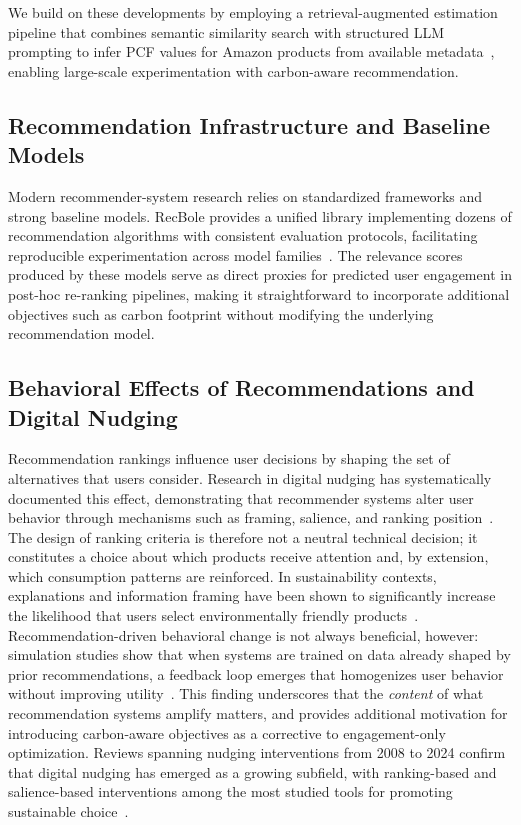 \documentclass[11pt]{article}
\begin{document}
We build on these developments by employing a retrieval-augmented estimation pipeline that
combines semantic similarity search with structured LLM prompting to infer PCF values for Amazon products from available
metadata~\cite{amazon2015, amazon2023}, enabling large-scale experimentation with
carbon-aware recommendation.

\subsection{Recommendation Infrastructure and Baseline Models}

Modern recommender-system research relies on standardized frameworks and strong baseline
models. RecBole provides a unified library implementing dozens of recommendation algorithms
with consistent evaluation protocols, facilitating reproducible experimentation across model
families~\cite{recbole2021}. The relevance scores produced by these models serve as direct
proxies for predicted user engagement in post-hoc re-ranking pipelines, making it
straightforward to incorporate additional objectives such as carbon footprint without
modifying the underlying recommendation model.

\subsection{Behavioral Effects of Recommendations and Digital Nudging}

Recommendation rankings influence user decisions by shaping the set of alternatives that
users consider. Research in digital nudging has systematically documented this effect,
demonstrating that recommender systems alter user behavior through mechanisms such as
framing, salience, and ranking position~\cite{jesse2021digitalnudging}. The design of
ranking criteria is therefore not a neutral technical decision; it constitutes a choice
about which products receive attention and, by extension, which consumption patterns are
reinforced. In sustainability contexts, explanations and information framing have been shown
to significantly increase the likelihood that users select environmentally friendly
products~\cite{halimeh2026nudging}. Recommendation-driven behavioral change is not always
beneficial, however: simulation studies show that when systems are trained on data already
shaped by prior recommendations, a feedback loop emerges that homogenizes user behavior
without improving utility~\cite{chaney2018confounding}. This finding underscores that the
\emph{content} of what recommendation systems amplify matters, and provides additional
motivation for introducing carbon-aware objectives as a corrective to engagement-only
optimization. Reviews spanning nudging interventions from 2008 to 2024 confirm that digital
nudging has emerged as a growing subfield, with ranking-based and salience-based
interventions among the most studied tools for promoting sustainable
choice~\cite{nudgereview2024}.
\end{document}

